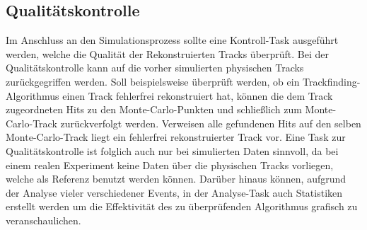 \subsection{Qualitätskontrolle}

Im Anschluss an den Simulationsprozess sollte eine Kontroll-Task ausgeführt werden, welche die Qualität der Rekonstruierten Tracks überprüft. Bei der Qualitätskontrolle kann auf die vorher simulierten physischen Tracks zurückgegriffen werden. Soll beispielsweise überprüft werden, ob ein Trackfinding-Algorithmus einen Track fehlerfrei rekonstruiert hat, können die dem Track zugeordneten Hits zu den Monte-Carlo-Punkten und schließlich zum Monte-Carlo-Track zurückverfolgt werden. Verweisen alle gefundenen Hits auf den selben Monte-Carlo-Track liegt ein fehlerfrei rekonstruierter Track vor. Eine Task zur Qualitätskontrolle ist folglich auch nur bei simulierten Daten sinnvoll, da bei einem realen Experiment keine Daten über die physischen Tracks vorliegen, welche als Referenz benutzt werden können. Darüber hinaus können, aufgrund der Analyse vieler verschiedener Events, in der Analyse-Task auch Statistiken erstellt werden um die Effektivität des zu überprüfenden Algorithmus grafisch zu veranschaulichen. \cite[S. 16-19]{MasterJette}